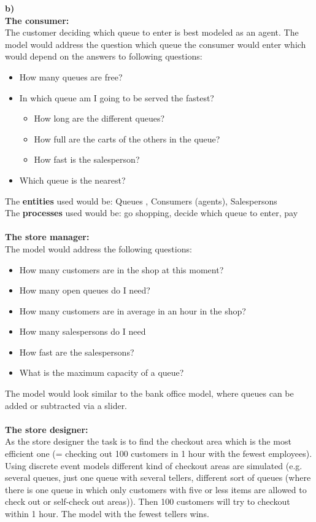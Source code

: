 \textbf{b)}\\
\textbf{The consumer:}\\
The customer deciding which queue to enter is best modeled as an agent. The model would address the question which queue the consumer would enter which would depend on the answers to following questions:
\begin{itemize}
  \item How many queues are free?
  \item In which queue am I going to be served the fastest?
  		\begin{itemize}
  		  \item How long are the different queues?
  		  \item How full are the carts of the others in the queue?
  		  \item How fast is the salesperson?		  
		\end{itemize}
  \item Which queue is the nearest?
\end{itemize}
The \textbf{entities} used would be: Queues , Consumers (agents), Salespersons\\
The \textbf{processes} used would be: go shopping, decide which queue to enter, pay\\\\
\textbf{The store manager:}\\
The model would address the following questions:
\begin{itemize}
  \item How many customers are in the shop at this moment?
    \item How many open queues do I need?
      \item How many customers are in average  in an hour in the shop?
        \item How many salespersons do I need
        \item How fast are the salespersons?
        \item What is the maximum capacity of a queue?
\end{itemize}
The model would look similar to the bank office model, where queues can be added or subtracted via a slider.\\\\
\textbf{The store designer:}\\
As the store designer the task is to find the checkout area which is the most efficient one 
(= checking out 100 customers in 1 hour with the fewest employees). Using discrete event models different
kind of checkout areas are simulated (e.g. several queues, just one queue with several tellers, different
sort of queues (where there is one queue in which only customers with five or less items are allowed to check out 
or self-check out areas)). Then 100 customers will try to checkout within 1 hour. The model with the fewest tellers wins.

